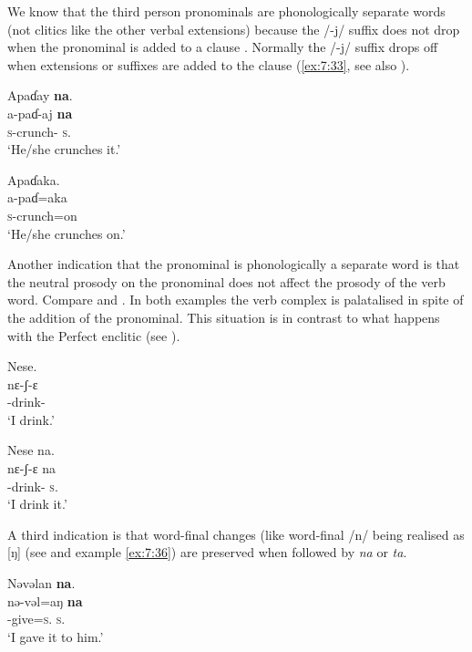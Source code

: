 We know that the third person \DO pronominals are phonologically separate words (not clitics like the other verbal extensions) because the /-j/ suffix does not drop when the \DO pronominal is added to a clause .  Normally the /-j/ suffix drops off when extensions or suffixes are added to the clause (\ref{ex:7:33}, see also ). 

\ea\label{ex:7:32}
Apaɗay  \textbf{na}.   \\   
\gll a-paɗ-aj     \textbf{na} \\     
\textsc{s}-crunch{}-{\CL}   \textsc{s}.{\DO}\\
\glt ‘He/she crunches it.’ 
\z

\ea\label{ex:7:33}
Apaɗaka.\\
\gll a-paɗ=aka\\
\textsc{s}-crunch=on\\
\glt ‘He/she crunches on.’ 
\z

Another indication that the \DO pronominal is phonologically a separate word is that the neutral prosody on the \DO pronominal does not affect the prosody of the verb word. Compare  and . In both examples the verb complex is palatalised in spite of the addition of the \DO pronominal. This situation is in contrast to what happens with the Perfect enclitic (see ). 

\ea\label{ex:7:34}
Nese.\\
\gll nɛ-ʃ{}-ɛ\\
{\oneS}-drink{}-{\CL}\\
\glt ‘I drink.’
\z

\ea\label{ex:7:35}
Nese  na.\\
\gll nɛ-ʃ{}-ɛ  na\\
{\oneS}-drink{}-{\CL}  \textsc{s}.{\DO}\\
\glt ‘I drink it.’ 
\z

A third indication is that word-final changes (like word-final /n/ being realised as [ŋ] (see  and example \ref{ex:7:36}) are preserved when followed by \textit{na} or \textit{ta}.

\ea\label{ex:7:36}
Nəvəlan  \textbf{na}. \\
\gll nə-vəl=aŋ     \textbf{na} \\
{\oneS}-give=\textsc{s}.{\IO}   \textsc{s}.{\DO}\\
\glt ‘I gave it to him.’
\z

